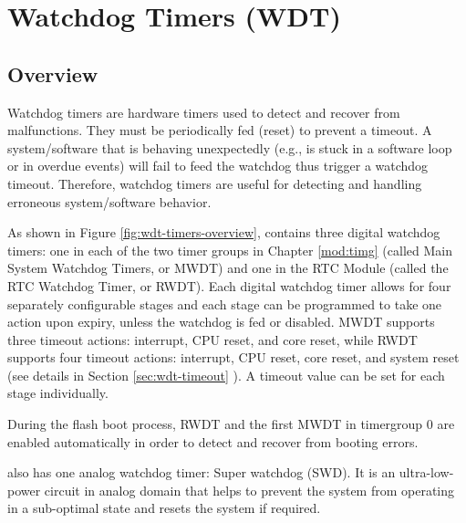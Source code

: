 \documentclass[main\_\_EN.tex]{subfiles}
\begin{document}

\ifglobal
\else
    {\let\clearpage\relax \listoftodos}
    \tableofcontents
\fi



\hypertarget{wdt}{}
\chapter{Watchdog Timers (WDT)}
\label{mod:wdt}

\section{Overview}

Watchdog timers are hardware timers used to detect and recover from malfunctions. They must be periodically fed (reset) to prevent a timeout. A system/software that is behaving unexpectedly (e.g., is stuck in a software loop or in overdue events) will fail to feed the watchdog thus trigger a watchdog timeout. Therefore, watchdog timers are useful for detecting and handling erroneous system/software behavior.

As shown in Figure \ref{fig:wdt-timers-overview}, \chipname{} contains three digital watchdog timers: one in each of the two timer groups in Chapter \ref{mod:timg} \textit{} (called Main System Watchdog Timers, or MWDT) and one in the RTC Module (called the RTC Watchdog Timer, or RWDT). Each digital watchdog timer allows for four separately configurable stages and each stage can be programmed to take one action upon expiry, unless the watchdog is fed or disabled. MWDT supports three timeout actions: interrupt, CPU reset, and core reset, while RWDT supports four timeout actions: interrupt, CPU reset, core reset, and system reset (see details in Section \ref{sec:wdt-timeout} \textit{}). A timeout value can be set for each stage individually.

During the flash boot process, RWDT and the first MWDT in timergroup 0 are enabled automatically in order to detect and recover from booting errors.

\chipname{} also has one analog watchdog timer: Super watchdog (SWD). It is an ultra-low-power circuit in analog domain that helps to prevent the system from operating in a sub-optimal state and resets the system if required.
\end{document}
